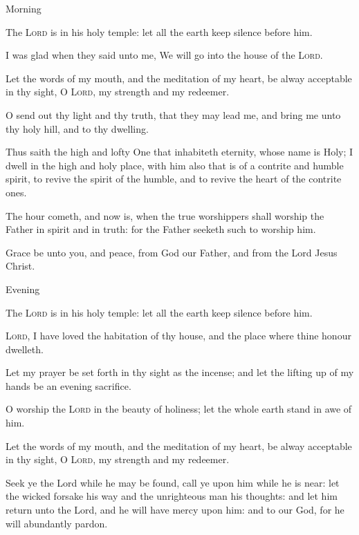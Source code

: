 \begin{multicols}{2}
\centerline{\color{RubricRed}\small%
Morning}
    The \textsc{Lord} is in his holy temple: let all the earth keep silence before him.\par
    I was glad when they said unto me, We will go into the house of the \textsc{Lord}.\par
    Let the words of my mouth, and the meditation of my heart, be alway acceptable in thy sight, O \textsc{Lord}, my strength and my redeemer.\par
    O send out thy light and thy truth, that they may lead me, and bring me unto thy holy hill, and to thy dwelling.\par
    Thus saith the high and lofty One that inhabiteth eternity, whose name is Holy; I dwell in the high and holy place, with him also that is of a contrite and humble spirit, to revive the spirit of the humble, and to revive the heart of the contrite ones.\par
    The hour cometh, and now is, when the true worshippers shall worship the Father in spirit and in truth: for the Father seeketh such to worship him.\par
    Grace be unto you, and peace, from God our Father, and from the Lord Jesus Christ.\\
    
\centerline{\color{RubricRed}\small%
Evening}
\par\noindent
    The \textsc{Lord} is in his holy temple: let all the earth keep silence before him.\par
    \textsc{Lord}, I have loved the habitation of thy house, and the place where thine honour dwelleth.\par
    Let my prayer be set forth in thy sight as the incense; and let the lifting up of my hands be an evening sacrifice.\par
    O worship the \textsc{Lord} in the beauty of holiness; let the whole earth stand in awe of him.\par
    Let the words of my mouth, and the meditation of my heart, be alway acceptable in thy sight, O \textsc{Lord}, my strength and my redeemer.\par
    Seek ye the Lord while he may be found, call ye upon him while he is near: let the wicked forsake his way and the unrighteous man his thoughts: and let him return unto the Lord, and he will have mercy upon him: and to our God, for he will abundantly pardon.\\
    

\end{multicols}
